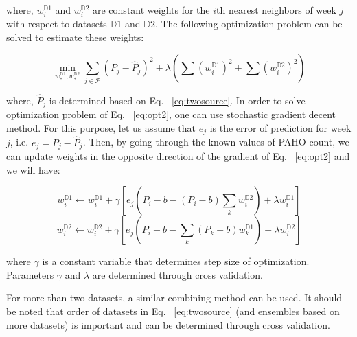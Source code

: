 where, $w_{i}^{\mathbb{D}1}$ and $w_{i}^{\mathbb{D}2}$ are constant weights for the $i$th nearest neighbors of week $j$ with respect to datasets $\mathbb{D}1$ and $\mathbb{D}2$. The following optimization problem can be solved to estimate these weights:

\begin{equation}
\min_{w_{*}^{\mathbb{D}1},w_{*}^{\mathbb{D}2}} \sum_{j \in \mathcal{P}} {(P_j - \hat{P}_j)^2} + \lambda (\sum_{}{}{{(w_{i}^{\mathbb{D}1})}^2}+\sum_{}{}{{(w_{i}^{\mathbb{D}2})}^2})
\label{eq:opt2}
\end{equation}




where, $\hat{P}_j$ is determined based on Eq. ~\ref{eq:twosource}. In order to solve optimization problem of Eq. ~\ref{eq:opt2}, one can use stochastic gradient decent method. For this purpose, let us assume that $e_j$ is the error of prediction for week $j$, i.e. $e_j = P_j - \hat{P}_j$. Then, by going through the known values of PAHO count, we can update weights in the opposite direction of the gradient of Eq. ~\ref{eq:opt2} and we will have:

\begin{equation}
w_{i}^{\mathbb{D}1} \leftarrow w_{i}^{\mathbb{D}1}+ \gamma \left [e_j(P_i - b - (P_i - b) \sum_{k}{}{w_{i}^{\mathbb{D}2}}) + \lambda w_{i}^{\mathbb{D}1}  \right ]
\end{equation}
\begin{equation}
w_{i}^{\mathbb{D}2} \leftarrow w_{i}^{\mathbb{D}2}+ \gamma \left [e_j(P_i - b - \sum_{k}{}{(P_k - b)w_{k}^{\mathbb{D}1}}) + \lambda w_{i}^{\mathbb{D}2}  \right ]
\end{equation}

where $\gamma$ is a constant variable that determines step size of optimization. Parameters $\gamma$ and $\lambda$ are determined through cross validation.

For more than two datasets, a similar combining method can be used. It should be noted that order of datasets in Eq. ~\ref{eq:twosource} (and ensembles based on more datasets) is important and can be determined through cross validation.
